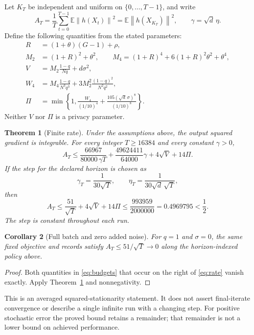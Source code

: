 \documentclass[11pt]{article}
\newtheorem{theorem}{Theorem}
\newtheorem{corollary}[theorem]{Corollary}
\newcommand{\E}{\mathbb E}
\newcommand{\norm}[1]{\left\|#1\right\|}
\begin{document}
Let $K_T$ be independent and uniform on $\{0,\ldots,T-1\}$, and write
\[
 A_T=\frac1T\sum_{t=0}^{T-1}\E\norm{h(X_t)}^2
     =\E\norm{h(X_{K_T})}^2,\qquad \gamma=\sqrt d\,\eta .
\]
Define the following quantities from the stated parameters:
\begin{align}
 R&=(1+\theta)(G-1)+\rho,\nonumber\\
 M_2&=(1+R)^2+\theta^2,\qquad
 M_4=(1+R)^4+6(1+R)^2\theta^2+\theta^4,\nonumber\\
 V&=M_2\frac{1-q}{Nq}+d\sigma^2,\label{eq:budgets}\\
 W_4&=M_4\frac{1-q}{N^3q^3}
             +3M_2^2\frac{(1-q)^2}{N^2q^2},\nonumber\\
 \Pi&=\min\left\{1,\frac{W_4}{(1/10)^4}
                  +\frac{105(\sqrt d\,\sigma)^8}{(1/10)^8}\right\}.\nonumber
\end{align}
Neither $V$ nor $\Pi$ is a privacy parameter.

\begin{theorem}[Finite rate]\label{thm:rate}
Under the assumptions above, the output squared gradient is integrable.
For every integer $T\ge16384$ and every constant $\gamma>0$,
\begin{equation}\label{eq:common}
 A_T\le\frac{66967}{80000\,\gamma T}
       +\frac{49624411}{64000}\gamma+4\sqrt V+14\Pi .
\end{equation}
If the step for the declared horizon is chosen as
\[
 \gamma_T=\frac1{30\sqrt T},\qquad
 \eta_T=\frac1{30\sqrt d\,\sqrt T},
\]
then
\begin{equation}\label{eq:rate}
 A_T\le\frac{51}{\sqrt T}+4\sqrt V+14\Pi
       \le\frac{993959}{2000000}=0.4969795<\frac12.
\end{equation}
The step is constant throughout each run.
\end{theorem}

\begin{corollary}[Full batch and zero added noise]\label{cor:limit}
For $q=1$ and $\sigma=0$, the same fixed objective and records satisfy
$A_T\le51/\sqrt T\to0$ along the horizon-indexed policy above.
\end{corollary}
\begin{proof}
Both quantities in \eqref{eq:budgets} that occur on the right of
\eqref{eq:rate} vanish exactly. Apply Theorem~\ref{thm:rate} and nonnegativity.
\end{proof}

This is an averaged squared-stationarity statement. It does not assert
final-iterate convergence or describe a single infinite run with a changing
step. For positive stochastic error the proved bound retains a remainder;
that remainder is not a lower bound on achieved performance.
\end{document}
